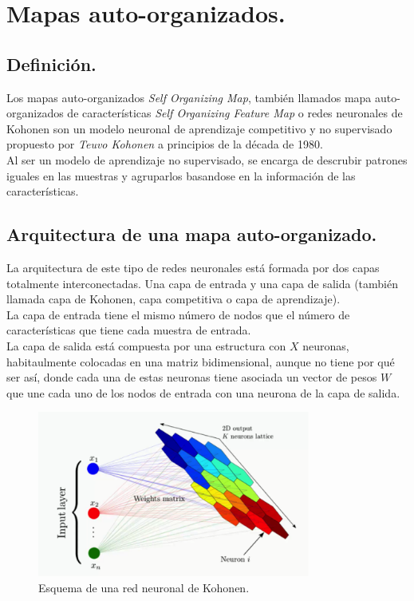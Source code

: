 \chapter{Mapas auto-organizados.}
\section{Definición.}
Los mapas auto-organizados \textit{Self Organizing Map}, también llamados mapa auto-organizados de características \textit{Self Organizing Feature Map} o redes neuronales de Kohonen son un modelo neuronal de aprendizaje competitivo y no supervisado propuesto por \textit{Teuvo Kohonen} a principios de la década de 1980.\\

Al ser un modelo de aprendizaje no supervisado, se encarga de descrubir patrones iguales en las muestras y agruparlos basandose en la información de las características. 

\section{Arquitectura de una mapa auto-organizado.}
La arquitectura de este tipo de redes neuronales está formada por dos capas totalmente interconectadas. Una capa de entrada y una capa de salida (también llamada capa de Kohonen, capa competitiva o capa de aprendizaje). \\

La capa de entrada tiene el mismo número de nodos que el número de características que tiene cada muestra de entrada.\\

La capa de salida está compuesta por una estructura con $X$ neuronas, habitaulmente colocadas en una matriz bidimensional, aunque no tiene por qué ser así, donde cada una de estas neuronas tiene asociada un vector de pesos $W$ que une cada uno de los nodos de entrada con una neurona de la capa de salida.
\begin{figure}
\centering
\includegraphics[width=0.8\textwidth]{imagenes/arquitectura_som.png}
\caption{Esquema de una red neuronal de Kohonen.}
\end{figure}
